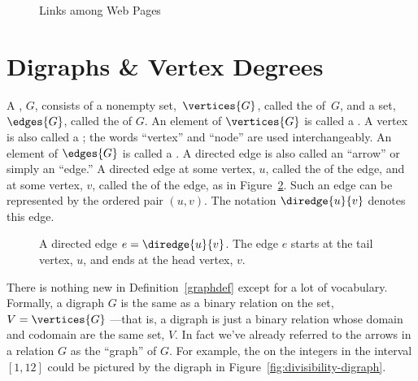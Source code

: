 \iffalse

and in the following graph the vertices $x_1, \ldots, x_n$ correspond
to web pages and $\diredge{x_i}{x_j}$ is a directed edge when page
$x_i$ contains a hyperlink to page $x_j$.
\fi


\begin{figure}


\caption{Links among Web Pages}

\label{webpage-links}

\end{figure}

\section{Digraphs \& Vertex Degrees}

\begin{definition}\label{graphdef}
  A , $G$, consists of a nonempty
  set,~$\vertices{G}$, called the  of~$G$, and a set,
  $\edges{G}$, called the  of $G$.  An element of
  $\vertices{G}$ is called a .  A vertex is also called a
  ; the words ``vertex'' and ``node'' are used
  interchangeably.  An element of $\edges{G}$ is called a
  .  A directed edge is also called an ``arrow''
  or simply an ``edge.''  A directed edge  at some vertex, $u$, called the 
  of the edge, and  at some vertex,
  $v$, called the  of the edge, as in Figure~\ref{fig:6EA}.
  Such an edge can be represented by the ordered pair $(u,v)$.  The
  notation $\diredge{u}{v}$ denotes this edge.
\end{definition}

\begin{figure}


\caption{A directed edge $e = \diredge{u}{v}$.  The edge $e$ starts at
  the tail vertex, $u$, and ends at the head vertex, $v$.}

\label{fig:6EA}
\end{figure}


There is nothing new in Definition~\ref{graphdef} except for a lot of
vocabulary.  Formally, a digraph $G$ is the same as a binary relation
on the set, $V = \vertices{G}$ ---that is, a digraph is just a binary
relation whose domain and codomain are the same set, $V$.  In fact
we've already referred to the arrows in a relation $G$ as the
``graph'' of $G$.  For example, the  on the
integers in the interval $[1,12]$ could be pictured by the digraph in
Figure~\ref{fig:divisibility-digraph}.


